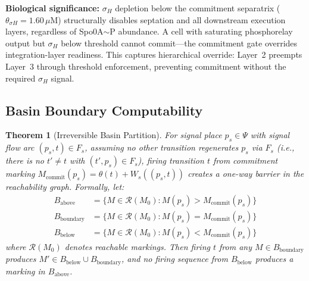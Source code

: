 \documentclass[10pt,letterpaper]{article}
\newtheorem{theorem}{Theorem}
\begin{document}
\textbf{Biological significance:} $\sigma_H$ depletion below the commitment separatrix ($\theta_{\sigma H} = 1.60\,\mu$M) structurally disables septation and all downstream execution layers, regardless of Spo0A$\sim$P abundance. A cell with saturating phosphorelay output but $\sigma_H$ below threshold cannot commit---the commitment gate overrides integration-layer readiness. This captures hierarchical override: Layer~2 preempts Layer~3 through threshold enforcement, preventing commitment without the required $\sigma_H$ signal.

\subsection{Basin Boundary Computability}

\begin{theorem}[Irreversible Basin Partition]
For signal place $p_s \in \Psi$ with signal flow arc $(p_s,t) \in F_s$,
assuming no other transition regenerates $p_s$ via $F_s$ (i.e., there is no
$t' \neq t$ with $(t',p_s) \in F_s$), firing transition $t$ from commitment
marking $M_{\text{commit}}(p_s) = \theta(t) + W_s((p_s,t))$ creates a one-way
barrier in the reachability graph. Formally, let:
\begin{align*}
B_{\text{above}} &= \{M \in \mathcal{R}(M_0) : M(p_s) > M_{\text{commit}}(p_s)\} \\
B_{\text{boundary}} &= \{M \in \mathcal{R}(M_0) : M(p_s) = M_{\text{commit}}(p_s)\} \\
B_{\text{below}} &= \{M \in \mathcal{R}(M_0) : M(p_s) < M_{\text{commit}}(p_s)\}
\end{align*}
where $\mathcal{R}(M_0)$ denotes reachable markings. Then firing $t$ from any $M \in B_{\text{boundary}}$ produces $M' \in B_{\text{below}} \cup B_{\text{boundary}}$, and no firing sequence from $B_{\text{below}}$ produces a marking in $B_{\text{above}}$.
\end{theorem}
\end{document}
